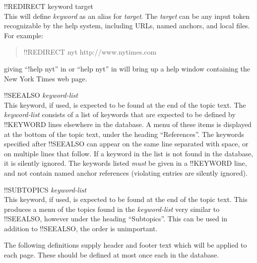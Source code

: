 \begin{description}
\item{\vt !!REDIRECT {\vt keyword target}}\\
This will define {\it keyword} as an alias for {\it target}.  The {\it
target} can be any input token recognizable by the help system,
including URLs, named anchors, and local files.  For example:
\begin{quote}
{\vt !!REDIRECT nyt http://www.nytimes.com}
\end{quote}
giving ``{\vt !help nyt}'' in {\Xic} or ``{\vt help nyt}'' in
{\WRspice} will bring up a help window containing the New York Times
web page.

\item{\vt !!SEEALSO {\it keyword-list}}\\
This keyword, if used, is expected to be found at the end of the topic
text.  The {\it keyword-list} consists of a list of keywords that are
expected to be defined by {\vt !!KEYWORD} lines elsewhere in the
database.  A menu of these items is displayed at the bottom of the
topic text, under the heading ``References''.  The keywords specified
after {\vt !!SEEALSO} can appear on the same line separated with
space, or on multiple lines that follow.  If a keyword in the list is
not found in the database, it is silently ignored.  The keywords
listed {\it must} be given in a {\vt !!KEYWORD} line, and not contain
named anchor references (violating entries are silently ignored).

\item{\vt !!SUBTOPICS {\it keyword-list}}\\
This keyword, if used, is expected to be found at the end of the topic
text.  This produces a menu of the topics found in the {\it
keyword-list} very similar to {\vt !!SEEALSO}, however under the
heading ``Subtopics''.  This can be used in addition to {\vt
!!SEEALSO}, the order is unimportant.
\end{description}

The following definitions supply header and footer text which will be
applied to each page.  These should be defined at most once each in
the database.

